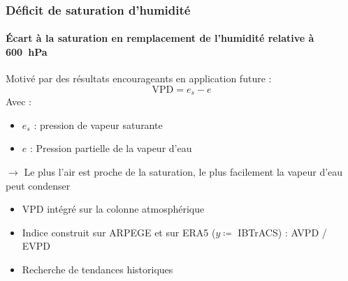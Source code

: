\documentclass[aspectratio=169, usepdftitle=false, xcolor={dvipsnames}, 9pt,table]{beamer}
\begin{document}
\begin{frame}
    \frametitle{Déficit de saturation d'humidité}
    \framesubtitle{Écart à la saturation en remplacement de l'humidité relative à 600~hPa}
    \small
    \begin{definition}
        \footnotesize
        Motivé par des résultats encourageants en application future \parencite{camargo_testing_2014}:\\
        \[ \text{VPD} = e_s - e \]
        Avec :
        \setlength{\leftmargini}{2.5ex}
        \begin{itemize}
            \item $e_s$ : pression de vapeur saturante
            \item $e$ : Pression partielle de la vapeur d'eau
        \end{itemize}
        \vspace{\baselineskip}
        $\longrightarrow$ Le plus l'air est proche de la saturation, le plus facilement la vapeur d'eau peut condenser
    \end{definition}
    \vspace{1em}
    \small
    \begin{examples}[Méthodologie]
        \footnotesize
        \begin{itemize}
            \item VPD intégré sur la colonne atmosphérique \parencite{camargo_testing_2014}
            \item Indice construit sur ARPEGE \alert{et} sur ERA5 ($y \coloneqq$ IBTrACS) : AVPD / EVPD
            \item Recherche de tendances historiques
        \end{itemize}
    \end{examples}
\end{frame}
\end{document}
